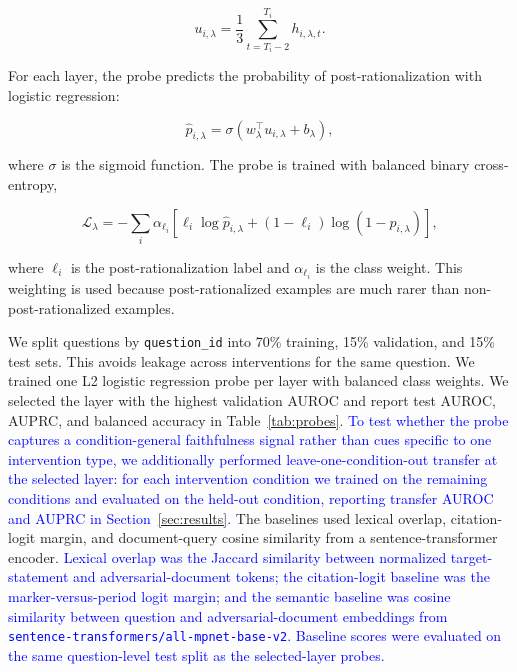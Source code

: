 \documentclass[a4paper,fleqn]{cas-sc}
\begin{document}
\begin{equation}
    u_{i,\lambda}=\frac{1}{3}\sum_{t=T_i-2}^{T_i} h_{i,\lambda,t}.
\end{equation}

For each layer, the probe predicts the probability of post-rationalization with logistic regression:

\begin{equation}
    \hat{p}_{i,\lambda}=\sigma(w_{\lambda}^{\top}u_{i,\lambda}+b_{\lambda}),
\end{equation}

where $\sigma$ is the sigmoid function. The probe is trained with balanced binary cross-entropy,

\begin{equation}
    \mathcal{L}_{\lambda}= -\sum_i \alpha_{\ell_i}\left[\ell_i \log \hat{p}_{i,\lambda} + (1-\ell_i)\log(1-\hat{p}_{i,\lambda})\right],
\end{equation}

where $\ell_i$ is the post-rationalization label and $\alpha_{\ell_i}$ is the class weight. This weighting is used because post-rationalized examples are much rarer than non-post-rationalized examples.

We split questions by \texttt{question\_id} into 70\% training, 15\% validation, and 15\% test sets. This avoids leakage across interventions for the same question. We trained one L2 logistic regression probe per layer with balanced class weights. We selected the layer with the highest validation AUROC and report test AUROC, AUPRC, and balanced accuracy in Table~\ref{tab:probes}. \textcolor{blue}{To test whether the probe captures a condition-general faithfulness signal rather than cues specific to one intervention type, we additionally performed leave-one-condition-out transfer at the selected layer: for each intervention condition we trained on the remaining conditions and evaluated on the held-out condition, reporting transfer AUROC and AUPRC in Section~\ref{sec:results}.} The baselines used lexical overlap, citation-logit margin, and document-query cosine similarity from a sentence-transformer encoder. \textcolor{blue}{Lexical overlap was the Jaccard similarity between normalized target-statement and adversarial-document tokens; the citation-logit baseline was the marker-versus-period logit margin; and the semantic baseline was cosine similarity between question and adversarial-document embeddings from \texttt{sentence-transformers/all-mpnet-base-v2}. Baseline scores were evaluated on the same question-level test split as the selected-layer probes.}
\end{document}
